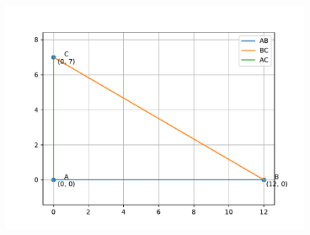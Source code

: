 %
\begin{figure}[H]
    \centering
    \includegraphics[width=0.75\columnwidth]{chapters/10/4/2/5/figs/triangle.pdf}
    \caption{}
	\label{fig:quad2}
\end{figure}
